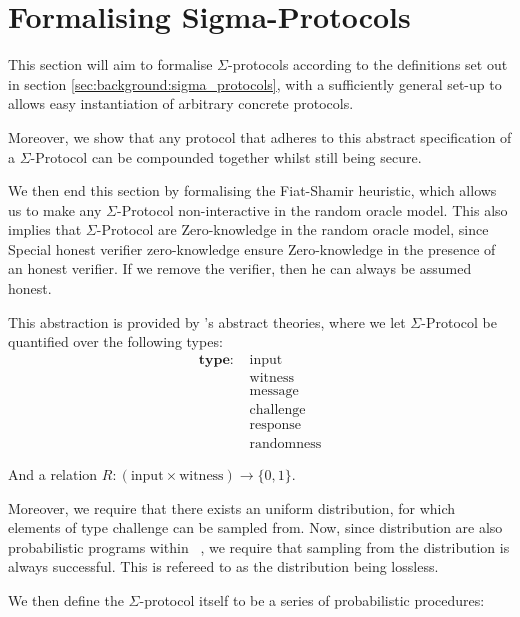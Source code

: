 \chapter{Formalising Sigma-Protocols}
\label{ch:formal_sigma}
This section will aim to formalise $\Sigma$-protocols according to the
definitions set out in section \ref{sec:background:sigma_protocols}, with a
sufficiently general set-up to allows easy instantiation of arbitrary concrete
protocols.

Moreover, we show that any protocol that adheres to this abstract specification
of a $\Sigma$-Protocol can be compounded together whilst still being secure.

We then end this section by formalising the Fiat-Shamir heuristic, which allows
us to make any $\Sigma$-Protocol non-interactive in the random oracle model.
This also implies that $\Sigma$-Protocol are Zero-knowledge in the random oracle
model, since Special honest verifier zero-knowledge ensure Zero-knowledge in the
presence of an honest verifier. If we remove the verifier, then he can always be
assumed honest.


This abstraction is provided by \easycrypt's abstract theories, where we let
$\Sigma$-Protocol be quantified over the following types:
\begin{align*}
  \textbf{type: } &\text{input} \\
                  &\text{witness} \\
                  &\text{message} \\
                  &\text{challenge} \\
                  &\text{response} \\
                  &\text{randomness}
\end{align*}

And a relation $R : (\text{input} \times \text{witness}) \rightarrow \{0,1\}$.

Moreover, we require that there exists an uniform distribution, for which
elements of type challenge can be sampled from. Now, since distribution are also
probabilistic programs within \easycrypt\ , we require that sampling from the
distribution is always successful. This is refereed to as the distribution being lossless.


We then define the $\Sigma$-protocol itself to be a series of probabilistic procedures:


